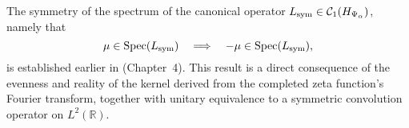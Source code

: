 \begin{remark}
\label{rem:spectral_symmetry_forward_ref}
The symmetry of the spectrum of the canonical operator \( L_{\mathrm{sym}} \in \mathcal{C}_1(H_{\Psi_\alpha}) \),
namely that
\[
\mu \in \operatorname{Spec}(L_{\mathrm{sym}}) \quad \Longrightarrow \quad -\mu \in \operatorname{Spec}(L_{\mathrm{sym}}),
\]
is established earlier in  (Chapter~4). This result is a direct consequence of the
evenness and reality of the kernel derived from the completed zeta function’s Fourier transform, together
with unitary equivalence to a symmetric convolution operator on \( L^2(\mathbb{R}) \).
\end{remark}
